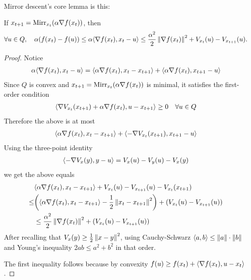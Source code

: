     Mirror descent's core lemma is this:
    \begin{lemma}
        \label{lem:mirror-descent}
        If $x_{t+1} = \mathrm{Mirr}_{x_t}(\alpha \nabla f(x_t))$, then
        \begin{align*}
            \forall u \in Q,\quad \alpha (f(x_t) - f(u)) \leq \alpha \langle \nabla f(x_t), x_t-u \rangle \leq \frac{\alpha^2}{2} \left\lVert \nabla f(x_t) \right\rVert^2 + V_{x_t}(u) - V_{x_{t+1}}(u).
        \end{align*}
    \end{lemma}
    \begin{proof}
        Notice
        \begin{align*}
            \alpha \langle \nabla f(x_t), x_t - u \rangle = \langle \alpha \nabla f(x_t), x_t-x_{t+1} \rangle + \langle \alpha \nabla f(x_t), x_{t+1} - u \rangle
        \end{align*}
        Since $Q$ is convex and $x_{t+1} = \mathrm{Mirr}_{x_t}(\alpha \nabla f(x_t))$ is minimal, it satisfies the first-order condition
        \begin{align*}
            \langle \nabla V_{x_t}(x_{t+1}) + \alpha \nabla f(x_t), u - x_{t+1} \rangle \geq 0 \quad \forall u \in Q
        \end{align*}
        Therefore the above is at most 
        \begin{align*}
            \langle \alpha \nabla f(x_t), x_t - x_{t+1} \rangle + \langle - \nabla V_{x_t}(x_{t+1}), x_{t+1} - u \rangle
        \end{align*}
        Using the three-point identity
        \begin{align*}
            \langle - \nabla V_x(y) , y-u \rangle = V_x(u) - V_y(u) - V_x(y)
        \end{align*}
        we get the above equals
        \begin{align*}
            &\langle \alpha \nabla f(x_t), x_t - x_{t+1} \rangle + V_{x_t}(u) - V_{x_{t+1}}(u) - V_{x_t}(x_{t+1}) \\
            \leq &\qty(\langle \alpha \nabla f(x_t), x_t-x_{t+1} \rangle - \frac 12 \left\lVert x_t-x_{t+1} \right\rVert^2) + (V_{x_t}(u) - V_{x_{t+1}}(u)) \\
            &\leq \frac{\alpha^2} 2 \left\lVert \nabla f(x_t) \right\rVert^2 + (V_{x_t}(u) - V_{x_{t+1}}(u))
        \end{align*}
        After recalling that $V_x(y) \geq \frac{1}{2}\left\lVert x-y \right\rVert^2$, using Cauchy-Schwarz $\langle a, b \rangle \leq \left\lVert a \right\rVert \cdot \left\lVert b \right\rVert$ and Young's inequality $2ab \leq a^2 + b^2$ in that order.

        The first inequality follows because by convexity $f(u) \geq f(x_t) + \langle \nabla f(x_t), u-x_t \rangle$.
    \end{proof}
